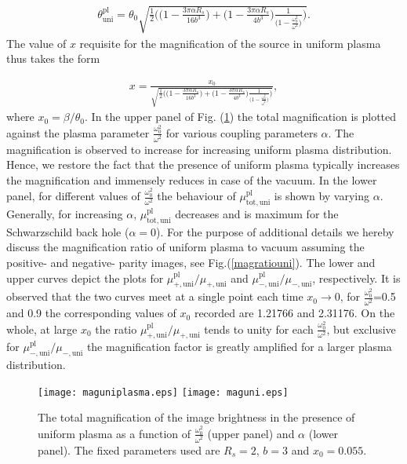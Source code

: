 \documentclass[final,5p,times,twocolumn,unknownkeysallowed]{elsarticle}
\begin{document}
\begin{align}\label{anguniplasma}
\theta^{\mathrm{pl}}_{\mathrm{uni}}=\theta_0\sqrt{\frac{1}{2}\bigg(\bigg(1-\frac{3\pi \alpha R_s}{16b^3}\bigg)+
\bigg(1-\frac{3\pi \alpha R_s}{4b^3}\bigg)\frac{1}{\big(1-\frac{\omega^2_0}{\omega^2}\big)}\bigg)}.
\end{align}
The value of $x$ requisite for the magnification of the source in uniform plasma thus takes the form

\begin{align}
x=\frac{x_0}{\sqrt{\frac{1}{2}\bigg(\bigg(1-\frac{3\pi \alpha R_s}{16b^3}\bigg)+
\bigg(1-\frac{3\pi \alpha R_s}{4b^3}\bigg)\frac{1}{\big(1-\frac{\omega^2_0}{\omega^2}\big)}\bigg)}},
\end{align}
where $x_0=\beta/\theta_0$. In the upper panel of Fig. (\ref{maguni}) the total magnification is plotted against
the plasma parameter $\frac{\omega^2_0}{\omega^2}$ for various coupling parameters $\alpha$. The magnification is observed to increase for
increasing uniform plasma distribution. Hence, we restore the fact that the presence of uniform plasma typically increases the magnification and immensely reduces in case of the vacuum\cite{Bin:2010a}. In the lower panel, for different values of $\frac{\omega^2_0}{\omega^2}$ the behaviour of  $\mu^\mathrm{pl}_\mathrm{tot,uni}$ is shown by varying $\alpha$. Generally, for increasing $\alpha$, $\mu^\mathrm{pl}_\mathrm{tot,uni}$ decreases and is maximum for the Schwarzschild back hole ($\alpha=0$). For the purpose of additional details we hereby discuss the magnification ratio of uniform plasma to vacuum assuming the positive- and negative- parity images, see Fig.(\ref{magratiouni}).
The lower and upper curves depict the plots for $\mu^\mathrm{pl}_\mathrm{+,uni}/\mu_\mathrm{+,uni}$ and
$\mu^\mathrm{pl}_\mathrm{-,uni}/\mu_\mathrm{-,uni}$, respectively. It is observed that the two curves meet at a single point each time $x_0 \rightarrow 0$,
for $\frac{\omega^2_0}{\omega^2}$=0.5 and 0.9 the corresponding values of $x_0$ recorded are 1.21766 and 2.31176. On the whole, at large $x_0$ the ratio
$\mu^\mathrm{pl}_\mathrm{+,uni}/\mu_\mathrm{+,uni}$ tends to unity for each $\frac{\omega^2_0}{\omega^2}$,
but exclusive for $\mu^\mathrm{pl}_\mathrm{-,uni}/\mu_\mathrm{-,uni}$ the magnification factor is greatly amplified for a larger plasma distribution.


\begin{figure}[h!]
 \begin{center}
   \texttt{[image: maguniplasma.eps]}
    \texttt{[image: maguni.eps]}
  \end{center}
\caption{The total magnification of the image brightness in the presence of uniform plasma as a function of $\frac{\omega^2_0}{\omega^2}$
(upper panel) and $\alpha$ (lower panel). The fixed parameters
used are $R_s=2$, $b=3$ and $x_0=0.055$.}\label{maguni}
\end{figure}
\end{document}
